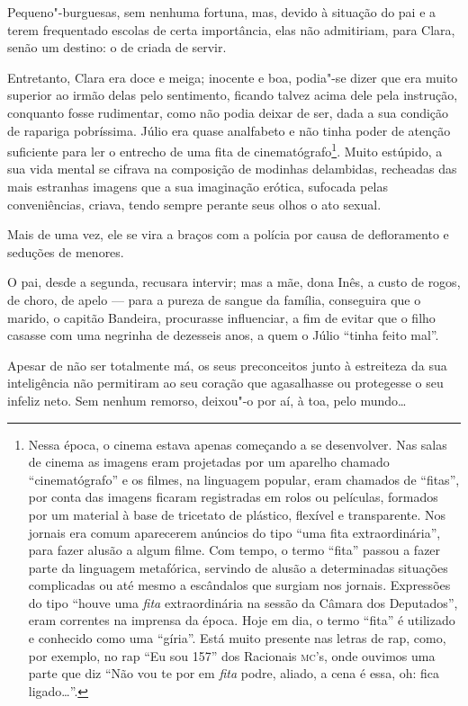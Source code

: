 Pequeno"-burguesas, sem nenhuma fortuna, mas, devido à situação do pai e
a terem frequentado escolas de certa importância, elas não admitiriam,
para Clara, senão um destino: o de criada de servir.

Entretanto, Clara era doce e meiga; inocente e boa, podia"-se dizer que
era muito superior ao irmão delas pelo sentimento, ficando talvez acima
dele pela instrução, conquanto fosse rudimentar, como não podia deixar
de ser, dada a sua condição de rapariga pobríssima. Júlio era quase
analfabeto e não tinha poder de atenção suficiente para ler o entrecho
de uma fita de cinematógrafo\footnote{Nessa época, o cinema estava
  apenas começando a se desenvolver. Nas salas de cinema as imagens eram
  projetadas por um aparelho chamado ``cinematógrafo'' e os filmes, na
  linguagem popular, eram chamados de ``fitas'', por conta das imagens
  ficaram registradas em rolos ou películas, formados por um material à
  base de tricetato de plástico, flexível e transparente. Nos jornais
  era comum aparecerem anúncios do tipo ``uma fita extraordinária'',
  para fazer alusão a algum filme. Com tempo, o termo ``fita'' passou a
  fazer parte da linguagem metafórica, servindo de alusão a determinadas
  situações complicadas ou até mesmo a escândalos que surgiam nos
  jornais. Expressões do tipo ``houve uma \emph{fita} extraordinária na
  sessão da Câmara dos Deputados'', eram correntes na imprensa da época.
  Hoje em dia, o termo ``fita'' é utilizado e conhecido como uma
  ``gíria''. Está muito presente nas letras de rap, como, por exemplo,
  no rap ``Eu sou 157'' dos Racionais \textsc{mc}'s, onde ouvimos uma parte que
  diz ``Não vou te por em \emph{fita} podre, aliado, a cena é essa, oh:
  fica ligado\ldots{}''.}. Muito estúpido, a sua vida mental se cifrava na
composição de modinhas delambidas, recheadas das mais estranhas imagens
que a sua imaginação erótica, sufocada pelas conveniências, criava,
tendo sempre perante seus olhos o ato sexual.

Mais de uma vez, ele se vira a braços com a polícia por causa de
defloramento e seduções de menores.

O pai, desde a segunda, recusara intervir; mas a mãe, dona Inês, a custo
de rogos, de choro, de apelo --- para a pureza de sangue da família,
conseguira que o marido, o capitão Bandeira, procurasse influenciar, a
fim de evitar que o filho casasse com uma negrinha de dezesseis anos, a
quem o Júlio ``tinha feito mal''.

Apesar de não ser totalmente má, os seus preconceitos junto à estreiteza
da sua inteligência não permitiram ao seu coração que agasalhasse ou
protegesse o seu infeliz neto. Sem nenhum remorso, deixou"-o por aí, à
toa, pelo mundo\ldots{}

